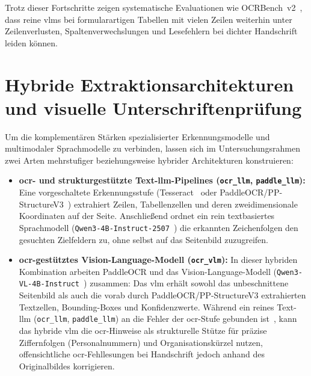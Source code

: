 Trotz dieser Fortschritte zeigen systematische Evaluationen wie OCRBench~v2~\cite{Fu2025OCRBenchV2}, dass reine \acp{vlm} bei formularartigen Tabellen mit vielen Zeilen weiterhin unter Zeilenverlusten, Spaltenverwechslungen und Lesefehlern bei dichter Handschrift leiden können.

\section{Hybride Extraktionsarchitekturen und visuelle Unterschriftenprüfung}
\label{sec:hybride-unterschrift}

Um die komplementären Stärken spezialisierter Erkennungsmodelle und multimodaler Sprachmodelle zu verbinden, lassen sich im Untersuchungsrahmen zwei Arten mehrstufiger beziehungsweise hybrider Architekturen konstruieren:
\begin{itemize}
  \item \textbf{\ac{ocr}- und strukturgestützte Text-\ac{llm}-Pipelines (\texttt{ocr\_llm}, \texttt{paddle\_llm}):} Eine vorgeschaltete Erkennungsstufe (Tesseract~\cite{Smith2007Tesseract} oder PaddleOCR/PP-StructureV3~\cite{Li2022PPOCRv3,PaddleSelectionStructure}) extrahiert Zeilen, Tabellenzellen und deren zweidimensionale Koordinaten auf der Seite. Anschließend ordnet ein rein textbasiertes Sprachmodell (\texttt{Qwen3-4B-Instruct-2507}~\cite{Yang2025Qwen3}) die erkannten Zeichenfolgen den gesuchten Zielfeldern zu, ohne selbst auf das Seitenbild zuzugreifen.
  \item \textbf{\ac{ocr}-gestütztes Vision-Language-Modell (\texttt{ocr\_vlm}):} In dieser hybriden Kombination arbeiten PaddleOCR und das Vision-Language-Modell (\texttt{Qwen3-VL-4B-Instruct}~\cite{Wang2024Qwen2VL,QwenSelectionVisionCard}) zusammen: Das \ac{vlm} erhält sowohl das unbeschnittene Seitenbild als auch die vorab durch PaddleOCR/PP-StructureV3 extrahierten Textzellen, Bounding-Boxes und Konfidenzwerte. Während ein reines Text-\ac{llm} (\texttt{ocr\_llm}, \texttt{paddle\_llm}) an die Fehler der \ac{ocr}-Stufe gebunden ist~\cite{vanStrien2020OCRQuality}, kann das hybride \ac{vlm} die \ac{ocr}-Hinweise als strukturelle Stütze für präzise Ziffernfolgen (Personalnummern) und Organisationskürzel nutzen, offensichtliche \ac{ocr}-Fehllesungen bei Handschrift jedoch anhand des Originalbildes korrigieren.
\end{itemize}

